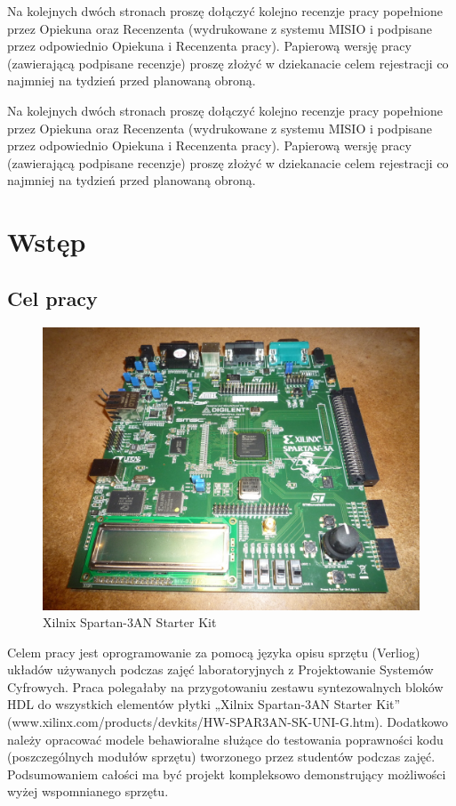 \documentclass[a4paper,12pt]{article}
\begin{document}
\newpage
\noindent
Na kolejnych dwóch stronach proszę dołączyć kolejno recenzje pracy popełnione przez Opiekuna oraz Recenzenta (wydrukowane z systemu MISIO i podpisane przez odpowiednio Opiekuna i Recenzenta pracy). Papierową wersję pracy (zawierającą podpisane recenzje) proszę złożyć w dziekanacie celem rejestracji co najmniej na tydzień przed planowaną obroną.

\newpage
\noindent
Na kolejnych dwóch stronach proszę dołączyć kolejno recenzje pracy popełnione przez Opiekuna oraz Recenzenta (wydrukowane z systemu MISIO i podpisane przez odpowiednio Opiekuna i Recenzenta pracy). Papierową wersję pracy (zawierającą podpisane recenzje) proszę złożyć w dziekanacie celem rejestracji co najmniej na tydzień przed planowaną obroną.


\vspace{85mm}
\newpage
\tableofcontents

\newpage
\section{Wstęp}

\subsection{Cel pracy}

\begin{figure}[htb]
   \centering
   \includegraphics{grafika/spartan3an.jpg}
   \caption{Xilnix Spartan-3AN Starter Kit}
\end{figure}

Celem pracy jest oprogramowanie za pomocą języka opisu sprzętu (Verliog) układów używanych podczas zajęć laboratoryjnych z Projektowanie Systemów Cyfrowych. Praca polegałaby na przygotowaniu zestawu syntezowalnych bloków HDL do wszystkich elementów płytki „Xilnix Spartan-3AN Starter Kit” (www.xilinx.com/products/devkits/HW-SPAR3AN-SK-UNI-G.htm). Dodatkowo należy opracować modele behawioralne służące do testowania poprawności kodu (poszczególnych modułów sprzętu) tworzonego przez studentów podczas zajęć. Podsumowaniem całości ma być projekt kompleksowo demonstrujący możliwości wyżej wspomnianego sprzętu.
\end{document}
